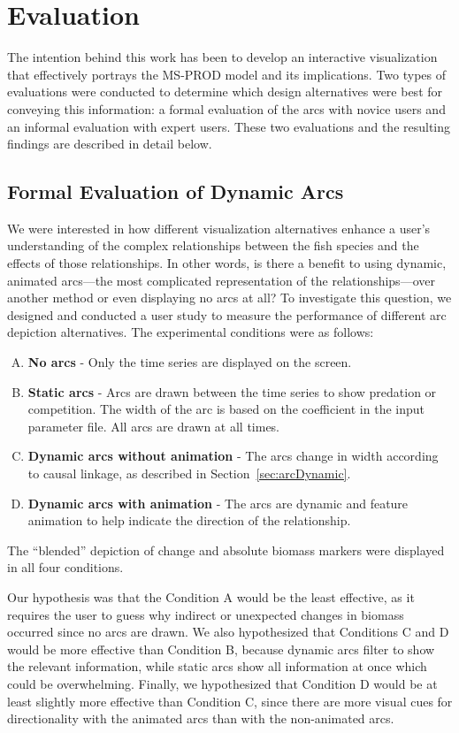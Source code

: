 \chapter{Evaluation}

The intention behind this work has been to develop an interactive visualization that effectively portrays the MS-PROD model and its implications.  Two types of evaluations were conducted to determine which design alternatives were best for conveying this information: a formal evaluation of the arcs with novice users and an informal evaluation with expert users.  These two evaluations and the resulting findings are described in detail below. 

\section{Formal Evaluation of Dynamic Arcs}

We were interested in how different visualization alternatives enhance a user's understanding of the complex relationships between the fish species and the effects of those relationships.  In other words, is there a benefit to using dynamic, animated arcs---the most complicated representation of the relationships---over another method or even displaying no arcs at all?  To investigate this question, we designed and conducted a user study to measure the performance of different arc depiction alternatives.  The experimental conditions were as follows:
\begin{enumerate}[(A)]
\item \textbf{No arcs} - Only the time series are displayed on the screen. 
\item \textbf{Static arcs} - Arcs are drawn between the time series to show predation or competition.  The width of the arc is based on the coefficient in the input parameter file.  All arcs are drawn at all times.
\item \textbf{Dynamic arcs without animation} - The arcs change in width according to causal linkage, as described in Section~\ref{sec:arcDynamic}.
\item \textbf{Dynamic arcs with animation} - The arcs are dynamic and feature animation to help indicate the direction of the relationship.
\end{enumerate}
The ``blended'' depiction of change and absolute biomass markers were displayed in all four conditions.

Our hypothesis was that the Condition A would be the least effective, as it requires the user to guess why indirect or unexpected changes in biomass occurred since no arcs are drawn.  We also hypothesized that Conditions C and D would be more effective than Condition B, because dynamic arcs filter to show the relevant information, while static arcs show all information at once which could be overwhelming.  Finally, we hypothesized that Condition D would be at least slightly more effective than Condition C, since there are more visual cues for directionality with the animated arcs than with the non-animated arcs.


